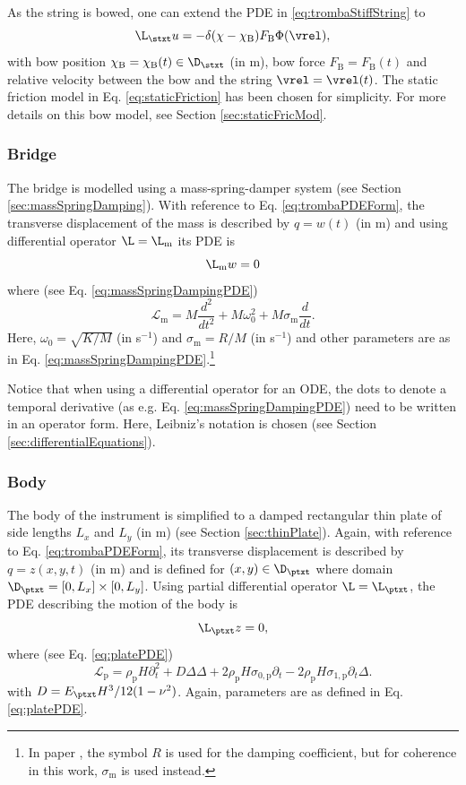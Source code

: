 As the string is bowed, one can extend the PDE in \eqref{eq:trombaStiffString} to 
\begin{equation}
    \L_\stxt u =  - \delta(\chi-\chi_\text{B})F_\text{B}\Phi(\vrel),
\end{equation}
with bow position $\chi_\text{B} = \chi_\text{B}(t) \in \D_\stxt$ (in m), bow force $F_\text{B} = F_\text{B}(t)$ and relative velocity between the bow and the string $\vrel=\vrel(t)$. The static friction model in Eq. \eqref{eq:staticFriction} has been chosen for simplicity. For more details on this bow model, see Section \ref{sec:staticFricMod}.

\subsubsection{Bridge}
The bridge is modelled using a mass-spring-damper system (see Section \ref{sec:massSpringDamping}). With reference to Eq. \eqref{eq:trombaPDEForm}, the transverse displacement of the mass is described by $q = w(t)$ (in m) and using differential operator $\L = \L_\text{m}$ its PDE is 
\begin{equation}
    \L_\text{m} w = 0
\end{equation}
where (see Eq. \eqref{eq:massSpringDampingPDE})
\begin{equation*}
    \mathcal{L}_\text{m}=M\frac{d^2}{dt^2}+M\omega_0^2+M\sigma_\text{m}\frac{d}{dt}.
\end{equation*}
Here, $\omega_0 = \sqrt{K/M}$ (in s$^{-1}$) and $\sigma_\text{m} = R/M$ (in s$^{-1}$) and other parameters are as in Eq. \eqref{eq:massSpringDampingPDE}.\footnote{In paper \citeP[D], the symbol $R$ is used for the damping coefficient, but for coherence in this work, $\sigma_\text{m}$ is used instead.} 

Notice that when using a differential operator for an ODE, the dots to denote a temporal derivative (as e.g. Eq. \eqref{eq:massSpringDampingPDE}) need to be written in an operator form. Here, Leibniz's notation is chosen (see Section \ref{sec:differentialEquations}). 


\subsubsection{Body}
The body of the instrument is simplified to a damped rectangular thin plate of side lengths $L_x$ and $L_y$ (in m) (see Section \ref{sec:thinPlate}). Again, with reference to Eq. \eqref{eq:trombaPDEForm}, its transverse displacement is described by $q = z(x, y, t)$ (in m) and is defined for $(x, y) \in \D_\ptxt$ where domain $\D_\ptxt = [0, L_x] \times [0, L_y]$. Using partial differential operator $\L = \L_\ptxt$, the PDE describing the motion of the body is 
\begin{equation}
    \L_\ptxt z = 0,
\end{equation}
where (see Eq. \eqref{eq:platePDE})
\begin{equation*}
    \mathcal{L}_\text{p} = \rho_\text{p}H\partial_t^2 + D\Delta\Delta +2\rho_\text{p}H\sigma_{0,\text{p}}\partial_t-2\rho_\text{p}H\sigma_{1,\text{p}}\partial_t\Delta.
\end{equation*}
with $D = E_\ptxt H^3/12(1-\nu^2)$. Again, parameters are as defined in Eq. \eqref{eq:platePDE}.

